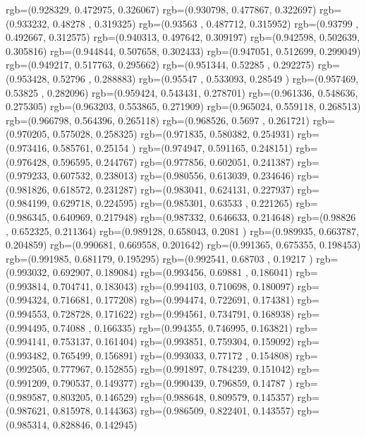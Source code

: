 {{{		  rgb=(0.928329,  0.472975,  0.326067)
		  rgb=(0.930798,  0.477867,  0.322697)
		  rgb=(0.933232,  0.48278 ,  0.319325)
		  rgb=(0.93563 ,  0.487712,  0.315952)
		  rgb=(0.93799 ,  0.492667,  0.312575)
		  rgb=(0.940313,  0.497642,  0.309197)
		  rgb=(0.942598,  0.502639,  0.305816)
		  rgb=(0.944844,  0.507658,  0.302433)
		  rgb=(0.947051,  0.512699,  0.299049)
		  rgb=(0.949217,  0.517763,  0.295662)
		  rgb=(0.951344,  0.52285 ,  0.292275)
		  rgb=(0.953428,  0.52796 ,  0.288883)
		  rgb=(0.95547 ,  0.533093,  0.28549 )
		  rgb=(0.957469,  0.53825 ,  0.282096)
		  rgb=(0.959424,  0.543431,  0.278701)
		  rgb=(0.961336,  0.548636,  0.275305)
		  rgb=(0.963203,  0.553865,  0.271909)
		  rgb=(0.965024,  0.559118,  0.268513)
		  rgb=(0.966798,  0.564396,  0.265118)
		  rgb=(0.968526,  0.5697  ,  0.261721)
		  rgb=(0.970205,  0.575028,  0.258325)
		  rgb=(0.971835,  0.580382,  0.254931)
		  rgb=(0.973416,  0.585761,  0.25154 )
		  rgb=(0.974947,  0.591165,  0.248151)
		  rgb=(0.976428,  0.596595,  0.244767)
		  rgb=(0.977856,  0.602051,  0.241387)
		  rgb=(0.979233,  0.607532,  0.238013)
		  rgb=(0.980556,  0.613039,  0.234646)
		  rgb=(0.981826,  0.618572,  0.231287)
		  rgb=(0.983041,  0.624131,  0.227937)
		  rgb=(0.984199,  0.629718,  0.224595)
		  rgb=(0.985301,  0.63533 ,  0.221265)
		  rgb=(0.986345,  0.640969,  0.217948)
		  rgb=(0.987332,  0.646633,  0.214648)
		  rgb=(0.98826 ,  0.652325,  0.211364)
		  rgb=(0.989128,  0.658043,  0.2081  )
		  rgb=(0.989935,  0.663787,  0.204859)
		  rgb=(0.990681,  0.669558,  0.201642)
		  rgb=(0.991365,  0.675355,  0.198453)
		  rgb=(0.991985,  0.681179,  0.195295)
		  rgb=(0.992541,  0.68703 ,  0.19217 )
		  rgb=(0.993032,  0.692907,  0.189084)
		  rgb=(0.993456,  0.69881 ,  0.186041)
		  rgb=(0.993814,  0.704741,  0.183043)
		  rgb=(0.994103,  0.710698,  0.180097)
		  rgb=(0.994324,  0.716681,  0.177208)
		  rgb=(0.994474,  0.722691,  0.174381)
		  rgb=(0.994553,  0.728728,  0.171622)
		  rgb=(0.994561,  0.734791,  0.168938)
		  rgb=(0.994495,  0.74088 ,  0.166335)
		  rgb=(0.994355,  0.746995,  0.163821)
		  rgb=(0.994141,  0.753137,  0.161404)
		  rgb=(0.993851,  0.759304,  0.159092)
		  rgb=(0.993482,  0.765499,  0.156891)
		  rgb=(0.993033,  0.77172 ,  0.154808)
		  rgb=(0.992505,  0.777967,  0.152855)
		  rgb=(0.991897,  0.784239,  0.151042)
		  rgb=(0.991209,  0.790537,  0.149377)
		  rgb=(0.990439,  0.796859,  0.14787 )
		  rgb=(0.989587,  0.803205,  0.146529)
		  rgb=(0.988648,  0.809579,  0.145357)
		  rgb=(0.987621,  0.815978,  0.144363)
		  rgb=(0.986509,  0.822401,  0.143557)
		  rgb=(0.985314,  0.828846,  0.142945)
}}}
